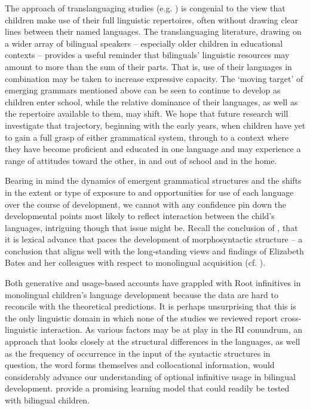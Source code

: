 \documentclass[output=paper]{langscibook}
\begin{document}
The approach of translanguaging studies (e.g. \citealt{Wei2018,Otheguy2015,Balam2021}) is congenial to the view that children make use of their full linguistic repertoires, often without drawing clear lines between their named languages. The translanguaging literature, drawing on a wider array of bilingual speakers – especially older children in educational contexts – provides a useful reminder that bilinguals’ linguistic resources may amount to more than the sum of their parts. That is, use of their languages in combination may be taken to increase expressive capacity. The ‘moving target’ of emerging grammars mentioned above can be seen to continue to develop as children enter school, while the relative dominance of their languages, as well as the repertoire available to them, may shift. We hope that future research will investigate that trajectory, beginning with the early years, when children have yet to gain a full grasp of either grammatical system, through to a context where they have become proficient and educated in one language and may experience a range of attitudes toward the other, in and out of school and in the home.

Bearing in mind the dynamics of emergent grammatical structures and the shifts in the extent or type of exposure to and opportunities for use of each language over the course of development, we cannot with any confidence pin down the developmental points most likely to reflect interaction between the child’s languages, intriguing though that issue might be. Recall the conclusion of \citet{ParadisEtAl2000}, that it is lexical advance that paces the development of morphosyntactic structure – a conclusion that aligns well with the long-standing views and findings of Elizabeth Bates and her colleagues with respect to monolingual acquisition (cf. \citealt{Bates1999}).

Both generative and usage-based accounts have grappled with Root infinitives in monolingual children’s language development because the data are hard to reconcile with the theoretical predictions. It is perhaps unsurprising that this is the only linguistic domain in which none of the studies we reviewed report cross-linguistic interaction. As various factors may be at play in the RI conundrum, an approach that looks closely at the structural differences in the languages, as well as the frequency of occurrence in the input of the syntactic structures in question, the word forms themselves and collocational information, would considerably advance our understanding of optional infinitive usage in bilingual development. \citet{FreudenthalEtAl2024} provide a promising learning model that could readily be tested with bilingual children.
\end{document}
